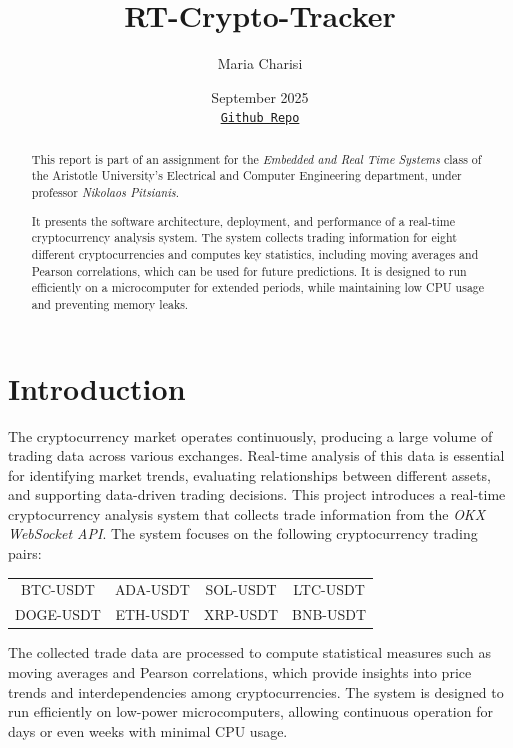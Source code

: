 \documentclass[11pt]{article}
\title{RT-Crypto-Tracker}
\author{Maria Charisi}
\date{September 2025\\ 
\href{https://github.com/mariaxarisi/RT-Crypto-Tracker}{\texttt{Github Repo}}}
\begin{document}
\maketitle

\begin{abstract}
This report is part of an assignment for the \textit{Embedded and Real Time Systems} class of the Aristotle University's Electrical and Computer Engineering department, under professor \textit{Nikolaos Pitsianis}.

It presents the software architecture, deployment, and performance of a real-time cryptocurrency analysis system. The system collects trading information for eight different cryptocurrencies and computes key statistics, including moving averages and Pearson correlations, which can be used for future predictions. It is designed to run efficiently on a microcomputer for extended periods, while maintaining low CPU usage and preventing memory leaks.
\end{abstract}

\tableofcontents
\newpage

\section{Introduction}
The cryptocurrency market operates continuously, producing a large volume of trading data across various exchanges. Real-time analysis of this data is essential for identifying market trends, evaluating relationships between different assets, and supporting data-driven trading decisions. This project introduces a real-time cryptocurrency analysis system that collects trade information from the \textit{OKX WebSocket API}. The system focuses on the following cryptocurrency trading pairs:

\begin{table} [h]
    \centering
    \begin{tabular}{cccc}
         BTC-USDT & ADA-USDT & SOL-USDT & LTC-USDT\\
         DOGE-USDT & ETH-USDT & XRP-USDT & BNB-USDT\\
    \end{tabular}
    \label{tab:trading_pairs}
\end{table}

The collected trade data are processed to compute statistical measures such as moving averages and Pearson correlations, which provide insights into price trends and interdependencies among cryptocurrencies. The system is designed to run efficiently on low-power microcomputers, allowing continuous operation for days or even weeks with minimal CPU usage.
\end{document}
